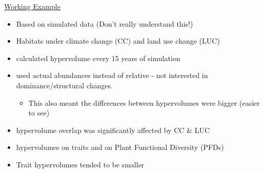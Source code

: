 \documentclass[11pt]{article}
\begin{document}
\begin{itemize}
		 \underline{Working Example}
		 \begin{itemize}
			 	\item Based on simulated data (Don't really understand this!)
			 	\item Habitats under climate change (CC) and land use change (LUC)
			 	\item calculated hypervolume every 15 years of simulation
			 	\item used actual abundances instead of relative - not interested in dominance/structural changes.
			 	\begin{itemize}
			 		\item This also meant the differences between hypervolumes were bigger (easier to see)
			 	\end{itemize}
			 	\item hypervolume overlap was significantly affected by CC \& LUC
			 	\item hypervolumes on traits and on Plant Functional Diversity (PFDs)
			 	\item Trait hypervolumes tended to be smaller
		 \end{itemize}
		\end{itemize}
			 
\end{document}
